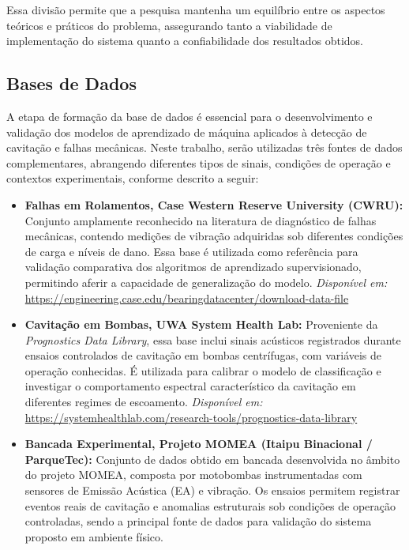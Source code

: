 Essa divisão permite que a pesquisa mantenha um equilíbrio entre os aspectos teóricos e práticos do problema, assegurando tanto a viabilidade de implementação do sistema quanto a confiabilidade dos resultados obtidos.

\subsection*{Bases de Dados}

A etapa de formação da base de dados é essencial para o desenvolvimento e validação dos modelos de aprendizado de máquina aplicados à detecção de cavitação e falhas mecânicas. Neste trabalho, serão utilizadas três fontes de dados complementares, abrangendo diferentes tipos de sinais, condições de operação e contextos experimentais, conforme descrito a seguir:

\begin{itemize}
    \item \textbf{Falhas em Rolamentos, Case Western Reserve University (CWRU):}  
    Conjunto amplamente reconhecido na literatura de diagnóstico de falhas mecânicas, contendo medições de vibração adquiridas sob diferentes condições de carga e níveis de dano. Essa base é utilizada como referência para validação comparativa dos algoritmos de aprendizado supervisionado, permitindo aferir a capacidade de generalização do modelo.  
    \textit{Disponível em:} \url{https://engineering.case.edu/bearingdatacenter/download-data-file}

    \item \textbf{Cavitação em Bombas, UWA System Health Lab:}  
    Proveniente da \textit{Prognostics Data Library}, essa base inclui sinais acústicos registrados durante ensaios controlados de cavitação em bombas centrífugas, com variáveis de operação conhecidas. É utilizada para calibrar o modelo de classificação e investigar o comportamento espectral característico da cavitação em diferentes regimes de escoamento.  
    \textit{Disponível em:} \url{https://systemhealthlab.com/research-tools/prognostics-data-library}

    \item \textbf{Bancada Experimental, Projeto MOMEA (Itaipu Binacional / ParqueTec):}  
    Conjunto de dados obtido em bancada desenvolvida no âmbito do projeto MOMEA, composta por motobombas instrumentadas com sensores de Emissão Acústica (EA) e vibração. Os ensaios permitem registrar eventos reais de cavitação e anomalias estruturais sob condições de operação controladas, sendo a principal fonte de dados para validação do sistema proposto em ambiente físico.
\end{itemize}


